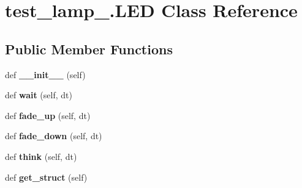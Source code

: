 \hypertarget{classtest__lamp__2_1_1LED}{}\section{test\+\_\+lamp\+\_.\+L\+E\+D Class Reference}
\label{classtest__lamp__2_1_1LED}
\subsection*{Public Member Functions}
\begin{DoxyCompactItemize}
\item 
\hypertarget{classtest__lamp__2_1_1LED_a7ebc26ddc38b044ace63df4740e163e3}{}def {\bfseries \+\_\+\+\_\+init\+\_\+\+\_\+} (self)\label{classtest__lamp__2_1_1LED_a7ebc26ddc38b044ace63df4740e163e3}

\item 
\hypertarget{classtest__lamp__2_1_1LED_ab53d42f3dc9b52d1c0b91bbc0c01f6bc}{}def {\bfseries wait} (self, dt)\label{classtest__lamp__2_1_1LED_ab53d42f3dc9b52d1c0b91bbc0c01f6bc}

\item 
\hypertarget{classtest__lamp__2_1_1LED_a5bd051e74e3c9a340c055cf6f89cefed}{}def {\bfseries fade\+\_\+up} (self, dt)\label{classtest__lamp__2_1_1LED_a5bd051e74e3c9a340c055cf6f89cefed}

\item 
\hypertarget{classtest__lamp__2_1_1LED_a72a2b7823a6090e98c117791b9dfdb82}{}def {\bfseries fade\+\_\+down} (self, dt)\label{classtest__lamp__2_1_1LED_a72a2b7823a6090e98c117791b9dfdb82}

\item 
\hypertarget{classtest__lamp__2_1_1LED_a99111af75afcb2bcdc19a2b6030786ce}{}def {\bfseries think} (self, dt)\label{classtest__lamp__2_1_1LED_a99111af75afcb2bcdc19a2b6030786ce}

\item 
\hypertarget{classtest__lamp__2_1_1LED_aad3c3abd2f25347cb7ff2e59ec44bb22}{}def {\bfseries get\+\_\+struct} (self)\label{classtest__lamp__2_1_1LED_aad3c3abd2f25347cb7ff2e59ec44bb22}

\end{DoxyCompactItemize}
